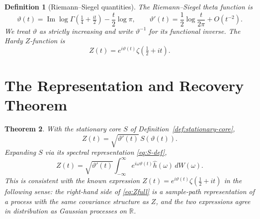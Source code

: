 \documentclass[11pt,a4paper]{article}
\newtheorem{theorem}{Theorem}
\newtheorem{definition}[theorem]{Definition}
\begin{document}
\begin{definition}[Riemann--Siegel quantities]
\label{def:rs}
The Riemann--Siegel theta function is
\begin{equation}
  \vartheta(t)=\operatorname{Im}\log\Gamma\!\left(\tfrac{1}{4}+\tfrac{it}{2}\right)
  -\frac{t}{2}\log\pi,
  \qquad
  \vartheta'(t)=\frac{1}{2}\log\frac{t}{2\pi}+O(t^{-2}).
\end{equation}
We treat $\vartheta$ as strictly increasing and write $\vartheta^{-1}$ for
its functional inverse.
The Hardy $Z$-function is
\begin{equation}
  Z(t)=e^{i\vartheta(t)}\zeta\!\left(\tfrac{1}{2}+it\right).
\end{equation}
\end{definition}

\section{The Representation and Recovery Theorem}

\begin{theorem}
\label{thm:main}
With the stationary core $S$ of Definition~\ref{def:stationary-core},
\begin{equation}
  \label{eq:Zrep}
  Z(t)=\sqrt{\vartheta'(t)}\,S(\vartheta(t)).
\end{equation}
Expanding $S$ via its spectral representation \eqref{eq:S-def},
\begin{equation}
  \label{eq:Zfull}
  Z(t)=\sqrt{\vartheta'(t)}\int_{-\infty}^{\infty}
        e^{i\omega\vartheta(t)}\hat{h}(\omega)\,dW(\omega).
\end{equation}
This is consistent with the known expression $Z(t)=e^{i\vartheta(t)}\zeta(\tfrac{1}{2}+it)$
in the following sense: the right-hand side of \eqref{eq:Zfull} is a sample-path
representation of a process with the same covariance structure as $Z$, and the
two expressions agree in distribution as Gaussian processes on $\mathbb{R}$.
\end{theorem}
\end{document}
